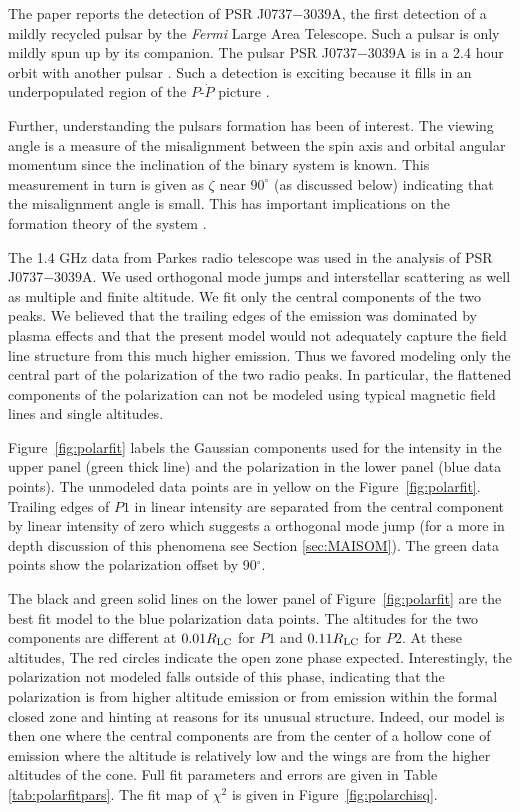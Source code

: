 The paper \citep{guillemot2013fermi} reports the detection of 
PSR J0737$-$3039A, the first detection of
a mildly recycled pulsar by the {\it Fermi} Large Area Telescope.  
Such a pulsar is only mildly spun up by its companion.
The pulsar PSR J0737$-$3039A
is in a 2.4 hour orbit with another pulsar
\citep{burgay2003increased,lyne2004double}.
Such a detection is exciting
because it fills in an underpopulated
region of the $P$-$\dot{P}$ picture
\citep{psrcat}.

Further,  understanding the pulsars formation has been 
of interest.
The viewing angle is a measure of the misalignment
between the spin axis and orbital angular momentum
since the inclination of the binary system is 
known.  This measurement in turn is given as $\zeta$
near $90^\circ$ (as discussed below) indicating 
that the misalignment angle is small.
This has important implications on the formation
theory of the system 
\citep{breton2008relativistic,ferdman2013double,podsiadlowski2005double}.

The 1.4 GHz data from Parkes radio telescope was
used in the analysis of 
PSR J0737$-$3039A.
We used orthogonal mode jumps and interstellar
scattering as well as multiple and finite altitude.
We fit only the central components of the two peaks. 
We believed that the trailing edges of
the emission was dominated by plasma effects
and that the present model would not adequately 
capture the field line structure from 
this much higher emission.  Thus we 
favored modeling only the central part
of the polarization of the two radio peaks.
In particular, the flattened components of 
the polarization can not be modeled using
typical magnetic field lines and single altitudes.  
 
Figure~\ref{fig:polarfit} labels the  
Gaussian components used for the intensity 
in the upper panel (green thick line) and the polarization in
the lower panel (blue data points).  
The unmodeled data points are in yellow on
the Figure~\ref{fig:polarfit}.
Trailing edges of $P1$ in linear intensity
are separated from the central component
by linear intensity of zero which suggests
a orthogonal mode jump (for a more in depth 
discussion of this phenomena see Section \ref{sec:MAISOM}). 
The green data points show the
polarization offset by 90$^\circ$.

The black and green solid lines on the lower
panel of Figure~\ref{fig:polarfit} are the best fit model
to the blue polarization data points.
The altitudes for the two components are
different at $0.01R_{\rm{LC}}$ for $P1$ and 
$0.11R_{\rm{LC}}$ for $P2$.  At these altitudes,
The red circles indicate the open zone 
phase expected.  Interestingly, the polarization
not modeled falls outside of this phase, indicating
that the polarization is from higher altitude emission
or from emission within the formal closed zone and hinting
at reasons for its unusual structure.  Indeed, our model is
then one where the central components are from the center
of a hollow cone of emission where the altitude is relatively low
and the wings are from the higher altitudes of the cone.
Full fit parameters and errors are given in Table \ref{tab:polarfitpars}.
The fit map of $\chi^2$ is given in Figure~\ref{fig:polarchisq}.

